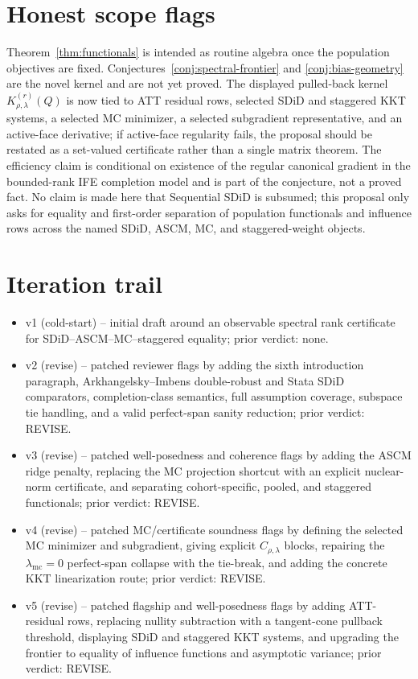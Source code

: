 \documentclass[11pt]{article}
\theoremstyle{definition}
\theoremstyle{plain}
\theoremstyle{remark}
\begin{document}
\section{Honest scope flags}
Theorem~\ref{thm:functionals} is intended as routine algebra once the population objectives are fixed.  Conjectures~\ref{conj:spectral-frontier} and \ref{conj:bias-geometry} are the novel kernel and are not yet proved.  The displayed pulled-back kernel \(K^{(r)}_{\rho,\lambda}(Q)\) is now tied to ATT residual rows, selected SDiD and staggered KKT systems, a selected MC minimizer, a selected subgradient representative, and an active-face derivative; if active-face regularity fails, the proposal should be restated as a set-valued certificate rather than a single matrix theorem.  The efficiency claim is conditional on existence of the regular canonical gradient in the bounded-rank IFE completion model and is part of the conjecture, not a proved fact.  No claim is made here that Sequential SDiD is subsumed; this proposal only asks for equality and first-order separation of population functionals and influence rows across the named SDiD, ASCM, MC, and staggered-weight objects.

\section{Iteration trail}
\begin{itemize}[leftmargin=*]
\item v1 (cold-start) -- initial draft around an observable spectral rank certificate for SDiD--ASCM--MC--staggered equality; prior verdict: none.
\item v2 (revise) -- patched reviewer flags by adding the sixth introduction paragraph, Arkhangelsky--Imbens double-robust and Stata SDiD comparators, completion-class semantics, full assumption coverage, subspace tie handling, and a valid perfect-span sanity reduction; prior verdict: REVISE.
\item v3 (revise) -- patched well-posedness and coherence flags by adding the ASCM ridge penalty, replacing the MC projection shortcut with an explicit nuclear-norm certificate, and separating cohort-specific, pooled, and staggered functionals; prior verdict: REVISE.
\item v4 (revise) -- patched MC/certificate soundness flags by defining the selected MC minimizer and subgradient, giving explicit \(C_{\rho,\lambda}\) blocks, repairing the \(\lambda_{\mathrm{mc}}=0\) perfect-span collapse with the tie-break, and adding the concrete KKT linearization route; prior verdict: REVISE.
\item v5 (revise) -- patched flagship and well-posedness flags by adding ATT-residual rows, replacing nullity subtraction with a tangent-cone pullback threshold, displaying SDiD and staggered KKT systems, and upgrading the frontier to equality of influence functions and asymptotic variance; prior verdict: REVISE.
\end{itemize}
\end{document}
